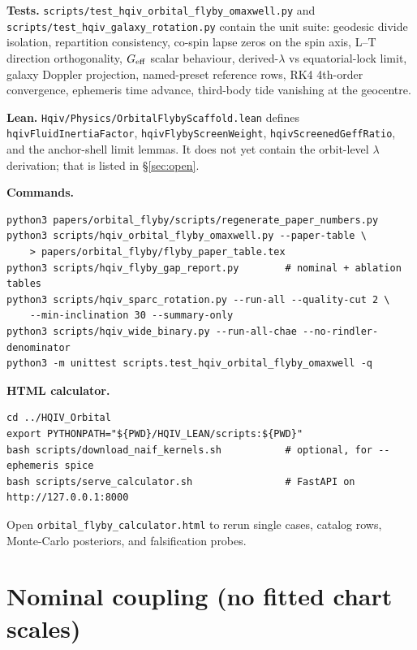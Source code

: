 \documentclass[11pt]{amsart}
\begin{document}
\textbf{Tests.} \texttt{scripts/test\_hqiv\_orbital\_flyby\_omaxwell.py} and
\texttt{scripts/test\_hqiv\_galaxy\_rotation.py} contain the unit
suite: geodesic divide isolation, repartition consistency,
co-spin lapse zeros on the spin axis, L--T direction orthogonality, $G_{\rm eff}$ scalar
behaviour, derived-$\lambda$ vs equatorial-lock limit, galaxy Doppler projection,
named-preset reference rows, RK4 4th-order convergence,
ephemeris time advance, third-body tide vanishing at the geocentre.

\textbf{Lean.} \texttt{Hqiv/Physics/OrbitalFlybyScaffold.lean} defines
\texttt{hqivFluidInertiaFactor}, \texttt{hqivFlybyScreenWeight},
\texttt{hqivScreenedGeffRatio}, and the anchor-shell limit lemmas. It does not yet contain
the orbit-level $\lambda$ derivation; that is listed in \S\ref{sec:open}.

\textbf{Commands.}
\begin{verbatim}
python3 papers/orbital_flyby/scripts/regenerate_paper_numbers.py
python3 scripts/hqiv_orbital_flyby_omaxwell.py --paper-table \
    > papers/orbital_flyby/flyby_paper_table.tex
python3 scripts/hqiv_flyby_gap_report.py        # nominal + ablation tables
python3 scripts/hqiv_sparc_rotation.py --run-all --quality-cut 2 \
    --min-inclination 30 --summary-only
python3 scripts/hqiv_wide_binary.py --run-all-chae --no-rindler-denominator
python3 -m unittest scripts.test_hqiv_orbital_flyby_omaxwell -q
\end{verbatim}

\textbf{HTML calculator.}
\begin{verbatim}
cd ../HQIV_Orbital
export PYTHONPATH="${PWD}/HQIV_LEAN/scripts:${PWD}"
bash scripts/download_naif_kernels.sh           # optional, for --ephemeris spice
bash scripts/serve_calculator.sh                # FastAPI on http://127.0.0.1:8000
\end{verbatim}
Open \texttt{orbital\_flyby\_calculator.html} to rerun single cases, catalog rows,
Monte-Carlo posteriors, and falsification probes.

\section{Nominal coupling (no fitted chart scales)}
\end{document}
